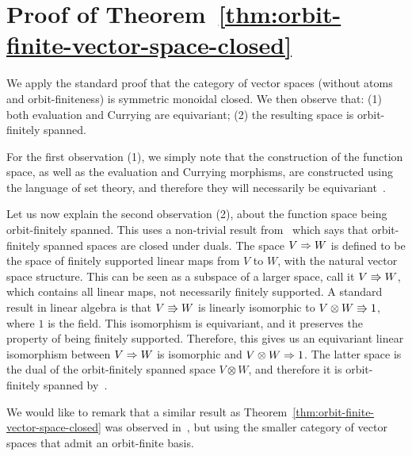 \section{Proof of Theorem~\ref{thm:orbit-finite-vector-space-closed}}
 We apply the standard proof that the category of vector spaces (without atoms and orbit-finiteness) is symmetric monoidal closed. We then observe that: (1) both evaluation and Currying are equivariant; (2) the resulting space is orbit-finitely spanned. 
    
    For the first observation (1), we simply note that the construction of the function space, as well as  the evaluation and Currying morphisms, are constructed using the language of set theory, and therefore they will necessarily be equivariant~\cite[Equivariance Principle]{bojanczyk_slightly2018}.

    Let us now explain the second observation (2), about the function space being orbit-finitely spanned. This uses a non-trivial result from~\cite{bojanczykKM21OrbitFiniteVector} which says that orbit-finitely spanned spaces are closed under duals. 
    The space $V \Rightarrow W$ is defined to be the space of finitely supported linear maps from $V$ to $W$, with the natural vector space structure. This can be seen as a subspace of a larger space, call it $V \Rrightarrow W$, which contains all linear maps, not necessarily finitely supported. A standard result in linear algebra is that $V \Rrightarrow W$ is linearly isomorphic to $ V \otimes W \Rrightarrow 1$, where $1$ is the field. This isomorphism is equivariant, and it preserves the property of being finitely supported. Therefore, this gives us an equivariant linear isomorphism between $V \Rightarrow W$ is isomorphic and $ V \otimes W \Rightarrow 1$. The latter space is the dual of the orbit-finitely spanned space $V \otimes W$, and therefore it is orbit-finitely spanned by~\cite[Corollary VI.5]{bojanczykKM21OrbitFiniteVector}.


    We would like to remark that a similar result as Theorem~\ref{thm:orbit-finite-vector-space-closed} was observed in~\cite[Theorem 3.8]{przybylek2024note}, but using the smaller category of vector spaces that admit an orbit-finite basis. 
